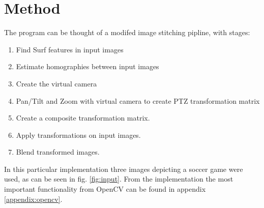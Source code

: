 \section{Method}

The program can be thought of a modifed image stitching pipline, with stages:
\begin{enumerate}
	\item Find Surf features in input images
	\item Estimate homographies between input images
	\item Create the virtual camera
	\item Pan/Tilt and Zoom with virtual camera to create PTZ transformation matrix
	\item Create a composite transformation matrix.
	\item Apply transformations on input images.
	\item Blend transformed images.
\end{enumerate}

In this particular implementation three images depicting a soccer game were used, as can be seen in fig. \ref{fig:input}. From the implementation the most important functionality from OpenCV can be found in appendix \ref{appendix:opencv}.

